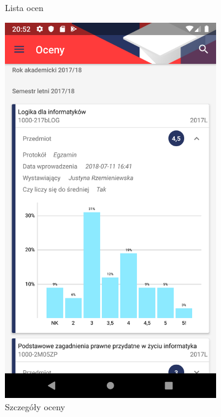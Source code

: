 \documentclass{pracamgr}
\begin{document}
\begin{figure}[p]
\begin{subfigure}[t]{0.3\textwidth}
		\caption{Lista ocen}
		\label{fig:grades_list}
	\end{subfigure}
	\quad
	\begin{subfigure}[t]{0.3\textwidth}
		\includegraphics[width=\textwidth]{img/grades_expanded.png}
		\caption{Szczegóły oceny}
		\label{fig:grades_expanded}
	\end{subfigure}
	\quad
    \begin{subfigure}[t]{0.3\textwidth}

\end{subfigure}
\end{figure}
\end{document}
